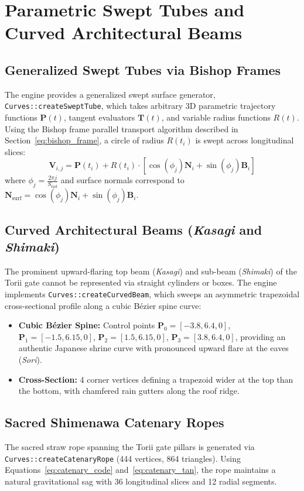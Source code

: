 \section{Parametric Swept Tubes and Curved Architectural Beams}
\subsection{Generalized Swept Tubes via Bishop Frames}
The engine provides a generalized swept surface generator, \texttt{Curves::createSweptTube}, which takes arbitrary 3D parametric trajectory functions $\mathbf{P}(t)$, tangent evaluators $\mathbf{T}(t)$, and variable radius functions $R(t)$. Using the Bishop frame parallel transport algorithm described in Section~\ref{eq:bishop_frame}, a circle of radius $R(t_i)$ is swept across longitudinal slices:
\begin{equation}
\mathbf{V}_{i, j} = \mathbf{P}(t_i) + R(t_i) \cdot \left[ \cos(\phi_j) \mathbf{N}_i + \sin(\phi_j) \mathbf{B}_i \right]
\label{eq:swept_vertex}
\end{equation}
where $\phi_j = \frac{2\pi j}{S_{\text{rad}}}$ and surface normals correspond to $\mathbf{N}_{\text{surf}} = \cos(\phi_j) \mathbf{N}_i + \sin(\phi_j) \mathbf{B}_i$.

\subsection{Curved Architectural Beams (\textit{Kasagi} and \textit{Shimaki})}
The prominent upward-flaring top beam (\textit{Kasagi}) and sub-beam (\textit{Shimaki}) of the Torii gate cannot be represented via straight cylinders or boxes. The engine implements \texttt{Curves::createCurvedBeam}, which sweeps an asymmetric trapezoidal cross-sectional profile along a cubic B\'ezier spine curve:
\begin{itemize}
    \item \textbf{Cubic B\'ezier Spine:} Control points $\mathbf{P}_0 = [-3.8, 6.4, 0]$, $\mathbf{P}_1 = [-1.5, 6.15, 0]$, $\mathbf{P}_2 = [1.5, 6.15, 0]$, $\mathbf{P}_3 = [3.8, 6.4, 0]$, providing an authentic Japanese shrine curve with pronounced upward flare at the eaves (\textit{Sori}).
    \item \textbf{Cross-Section:} 4 corner vertices defining a trapezoid wider at the top than the bottom, with chamfered rain gutters along the roof ridge.
\end{itemize}

\subsection{Sacred Shimenawa Catenary Ropes}
The sacred straw rope spanning the Torii gate pillars is generated via \texttt{Curves::createCatenaryRope} (444 vertices, 864 triangles). Using Equations~\ref{eq:catenary_code} and~\ref{eq:catenary_tan}, the rope maintains a natural gravitational sag with 36 longitudinal slices and 12 radial segments.

